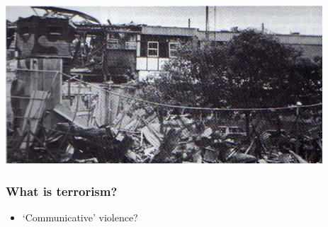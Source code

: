 \documentclass[aspectratio=43]{beamer}
\begin{document}
\begin{frame}
\begin{minipage}{.49\textwidth}
  \includegraphics[width = \textwidth]{img/glenanne}\\
\end{minipage}

\end{frame}


\begin{frame}
\frametitle{What is terrorism?}
\centering

\begin{itemize}
  \item `Communicative' violence?
\end{itemize}

\vspace{20pt}


\end{frame}


\end{document}
